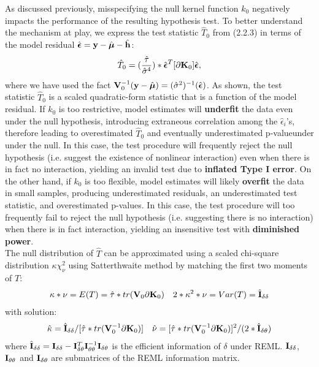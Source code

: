 \documentclass[11pt]{article}
\begin{document}
As discussed previously, misspecifying the null kernel function $k_0$ negatively impacts the performance of the resulting hypothesis test. To better understand the mechanism at play, we express the test statistic $\hat{T}_0$ from (2.2.3) in terms of the model residual $\hat{\boldsymbol{\epsilon}}={\bf y}-\hat{\boldsymbol{\mu}}-\hat{{\bf h}}$:
\begin{align}
\hat{T}_0=(\frac{\hat{\tau}}{\hat{\sigma}^4})*\hat{\boldsymbol{\epsilon}}^T[\partial {\bf K}_0]\hat{\boldsymbol{\epsilon}},
\end{align}
where we have used the fact ${\bf V}_0^{-1}({\bf y}-\hat{\boldsymbol{\mu}})=(\hat{\sigma}^2)^{-1}(\hat{\boldsymbol{\epsilon}})$. As shown, the test statistic $\hat{T}_0$ is a scaled quadratic-form statistic that is a function of the model residual. If $k_0$ is too restrictive, model estimates will \textbf{underfit} the data even under the null hypothesis, introducing extraneous correlation among the $\hat{\epsilon}_i$'s, therefore leading to overestimated $\hat{T}_0$ and eventually underestimated p-valueunder under the null. In this case, the test procedure will frequently reject the null hypothesis (i.e. suggest the existence of nonlinear interaction) even when there is in fact no interaction, yielding an invalid test due to \textbf{inflated Type I error}. On the other hand, if $k_0$ is too flexible, model estimates will likely \textbf{overfit} the data in small samples, producing underestimated residuals, an underestimated test statistic, and overestimated p-values. In this case, the test procedure will too frequently fail to reject the null hypothesis (i.e. suggesting there is no interaction) when there is in fact interaction, yielding an insensitive test with \textbf{diminished power}.\\
The null distribution of $\hat{T}$ can be approximated using a scaled chi-square distribution $\kappa \chi_\nu^2$ using Satterthwaite method by matching the first two moments of $T$:
\begin{align*}
\kappa * \nu=E(T)=\hat{\tau} * tr({\bf V}_0\partial {\bf K}_0)
 \quad 2*\kappa^2*\nu=Var(T)=\hat{{\bf I}}_{\delta\delta}
\end{align*}
with solution:
\begin{align*}
\hat{\kappa}=\hat{{\bf I}}_{\delta\delta}/[\hat{\tau}*tr({\bf V}_0^{-1}\partial {\bf K}_0)] \quad \hat{\nu}=[\hat{\tau}*tr({\bf V}_0^{-1}\partial {\bf K}_0)]^2/(2*\hat{{\bf I}}_{\delta\theta})
\end{align*}
where $\hat{{\bf I}}_{\delta\delta}={\bf I}_{\delta\delta}-{\bf I}_{\delta\theta}^T{\bf I}_{\theta\theta}^{-1}{\bf I}_{\delta\theta}$ is the efficient information of $\delta$ under REML. ${\bf I}_{\delta\delta}$, ${\bf I}_{\theta\theta}$ and ${\bf I}_{\delta\theta}$ are submatrices of the REML information matrix. 
\end{document}
